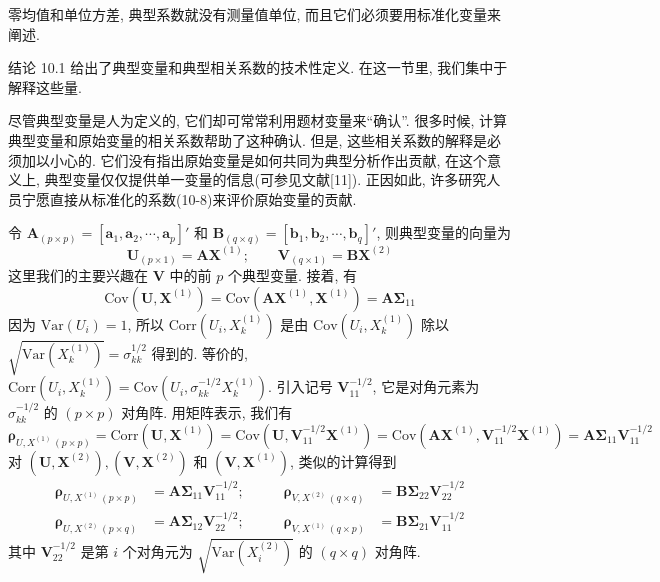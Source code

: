
零均值和单位方差, 典型系数就没有测量值单位, 而且它们必须要用标准化变量来阐述.

结论 10.1 给出了典型变量和典型相关系数的技术性定义. 在这一节里, 我们集中于解释这些量.


尽管典型变量是人为定义的, 它们却可常常利用题材变量来“确认”. 很多时候, 计算典型变量和原始变量的相关系数帮助了这种确认. 但是, 这些相关系数的解释是必须加以小心的. 它们没有指出原始变量是如何共同为典型分析作出贡献, 在这个意义上, 典型变量仅仅提供单一变量的信息(可参见文献[11]). 正因如此, 许多研究人员宁愿直接从标准化的系数(10-8)来评价原始变量的贡献.

令 $\mathbf{A}_{(p\times p)}=[\mathbf{a}_1,\mathbf{a}_2,\cdots,\mathbf{a}_p]'$ 和 $\mathbf{B}_{(q\times q)}=[\mathbf{b}_1,\mathbf{b}_2,\cdots,\mathbf{b}_q]'$, 则典型变量的向量为
\label{eq:10-12}
\begin{equation}
\mathbf{U}_{(p\times 1)}=\mathbf{A}\mathbf{X}^{(1)};\qquad \mathbf{V}_{(q\times 1)}=\mathbf{B}\mathbf{X}^{(2)}
\tag{10-12}
\end{equation}
这里我们的主要兴趣在 $\mathbf{V}$ 中的前 $p$ 个典型变量. 接着, 有
\label{eq:10-13}
\begin{equation}
\mathrm{Cov}(\mathbf{U},\mathbf{X}^{(1)})=\mathrm{Cov}(\mathbf{A}\mathbf{X}^{(1)},\mathbf{X}^{(1)})=\mathbf{A}\boldsymbol{\Sigma}_{11}
\tag{10-13}
\end{equation}
因为 $\mathrm{Var}(U_i)=1$, 所以 $\mathrm{Corr}(U_i,X_k^{(1)})$ 是由 $\mathrm{Cov}(U_i,X_k^{(1)})$ 除以 $\sqrt{\mathrm{Var}(X_k^{(1)})}=\sigma_{kk}^{1/2}$ 得到的. 等价的, $\mathrm{Corr}(U_i,X_k^{(1)})=\mathrm{Cov}(U_i,\sigma_{kk}^{-1/2}X_k^{(1)})$. 引入记号 $\mathbf{V}_{11}^{-1/2}$, 它是对角元素为 $\sigma_{kk}^{-1/2}$ 的 $(p\times p)$ 对角阵. 用矩阵表示, 我们有
\[
\boldsymbol{\rho}_{U,X^{(1)}\,(p\times p)}=\mathrm{Corr}(\mathbf{U},\mathbf{X}^{(1)})=\mathrm{Cov}(\mathbf{U},\mathbf{V}_{11}^{-1/2}\mathbf{X}^{(1)})=\mathrm{Cov}(\mathbf{A}\mathbf{X}^{(1)},\mathbf{V}_{11}^{-1/2}\mathbf{X}^{(1)})=\mathbf{A}\boldsymbol{\Sigma}_{11}\mathbf{V}_{11}^{-1/2}
\]
对 $(\mathbf{U},\mathbf{X}^{(2)}),(\mathbf{V},\mathbf{X}^{(2)})$ 和 $(\mathbf{V},\mathbf{X}^{(1)})$, 类似的计算得到
\label{eq:10-14}
\begin{equation}
\begin{aligned}
\boldsymbol{\rho}_{U,X^{(1)}\,(p\times p)}&=\mathbf{A}\boldsymbol{\Sigma}_{11}\mathbf{V}_{11}^{-1/2}; &\qquad \boldsymbol{\rho}_{V,X^{(2)}\,(q\times q)}&=\mathbf{B}\boldsymbol{\Sigma}_{22}\mathbf{V}_{22}^{-1/2}\\
\boldsymbol{\rho}_{U,X^{(2)}\,(p\times q)}&=\mathbf{A}\boldsymbol{\Sigma}_{12}\mathbf{V}_{22}^{-1/2}; &\qquad \boldsymbol{\rho}_{V,X^{(1)}\,(q\times p)}&=\mathbf{B}\boldsymbol{\Sigma}_{21}\mathbf{V}_{11}^{-1/2}
\end{aligned}
\tag{10-14}
\end{equation}
其中 $\mathbf{V}_{22}^{-1/2}$ 是第 $i$ 个对角元为 $\sqrt{\mathrm{Var}(X_i^{(2)})}$ 的 $(q\times q)$ 对角阵.

